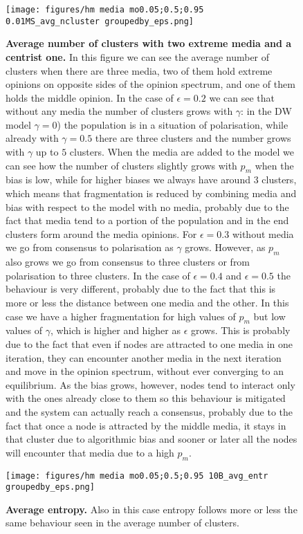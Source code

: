 \documentclass[10pt,letterpaper]{article}
\begin{document}
\begin{figure}
    \centering
    \texttt{[image: figures/hm media mo0.05;0.5;0.95 0.01MS\_avg\_ncluster groupedby\_eps.png]}
    \caption{\textbf{Average number of clusters with two extreme media and a centrist one.} In this figure we can see the average number of clusters when there are three media, two of them hold extreme opinions on opposite sides of the opinion spectrum, and one of them holds the middle opinion. In the case of $\epsilon=0.2$ we can see that without any media the number of clusters grows with $\gamma$: in the DW model $\gamma=0$) the population is in a situation of polarisation, while already with $\gamma=0.5$ there are three clusters and the number grows with $\gamma$ up to $5$ clusters. When the media are added to the model we can see how the number of clusters slightly grows with $p_m$ when the bias is low, while for higher biases we always have around $3$ clusters, which means that fragmentation is reduced by combining media and bias with respect to the model with no media, probably due to the fact that media tend to  a portion of the population and in the end clusters form around the media opinions. For $\epsilon=0.3$ without media we go from consensus to polarisation as $\gamma$ grows. However, as $p_m$ also grows we go from consensus to three clusters or from polarisation to three clusters. In the case of $\epsilon=0.4$ and $\epsilon=0.5$ the behaviour is very different, probably due to the fact that this is more or less the distance between one media and the other. In this case we have a higher fragmentation for high values of $p_m$ but low values of $\gamma$, which is higher and higher as $\epsilon$ grows. This is probably due to the fact that even if nodes are attracted to one media in one iteration, they can encounter another media in the next iteration and move in the opinion spectrum, without ever converging to an equilibrium. As the bias grows, however, nodes tend to interact only with the ones already close to them so this behaviour is mitigated and the system can actually reach a consensus, probably due to the fact that once a node is attracted by the middle media, it stays in that cluster due to algorithmic bias and sooner or later all the nodes will encounter that media due to a high $p_m$.}
    \label{fig:3mediaavgnclusterbyeps}
\end{figure}

\begin{figure}
    \centering
    \texttt{[image: figures/hm media mo0.05;0.5;0.95 10B\_avg\_entr groupedby\_eps.png]}
    \caption{\textbf{Average entropy.} Also in this case entropy follows more or less the same behaviour seen in the average number of clusters.}
    \label{fig:3mediaavgentrbyeps}
\end{figure}
\end{document}
